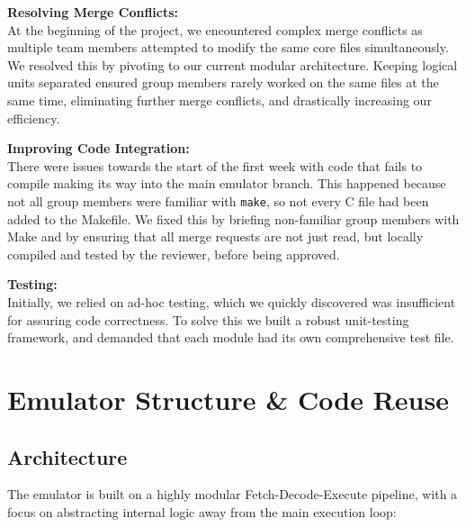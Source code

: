 \documentclass[11pt]{article}
\begin{document}
\vspace{0.2cm}\noindent\textbf{Resolving Merge Conflicts:}\\
At the beginning of the project, we encountered complex merge conflicts as multiple team members attempted to modify the same core files simultaneously. We resolved this by pivoting to our current modular architecture. Keeping logical units separated ensured group members rarely worked on the same files at the same time, eliminating further merge conflicts, and drastically increasing our efficiency.

\vspace{0.2cm}\noindent\textbf{Improving Code Integration:}\\
There were issues towards the start of the first week with code that fails to compile making its way into the main emulator branch. This happened because not all group members were familiar with \texttt{make}, so not every C file had been added to the Makefile. We fixed this by briefing non-familiar group members with Make and by ensuring that all merge requests are not just read, but locally compiled and tested by the reviewer, before being approved.

\vspace{0.2cm}\noindent\textbf{Testing:}\\
Initially, we relied on ad-hoc testing, which we quickly discovered was insufficient for assuring code correctness. To solve this we built a robust unit-testing framework, and demanded that each module had its own comprehensive test file.
\section{Emulator Structure \& Code Reuse}
\vspace{-0.1cm}
\subsection{Architecture}
The emulator is built on a highly modular Fetch-Decode-Execute pipeline, with a focus on abstracting internal logic away from the main execution loop:
\end{document}
